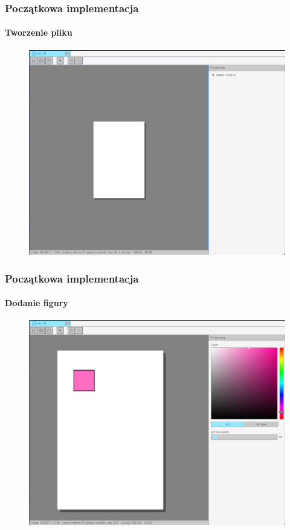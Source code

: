 \documentclass[
	11pt,]{beamer}
\begin{document}
\begin{frame}
	\frametitle{Początkowa implementacja}
	\framesubtitle{Tworzenie pliku}
	
	\begin{figure}
		\includegraphics[height=0.7\textheight]{figures/pro2.png}
	\end{figure}
\end{frame}

\begin{frame}
	\frametitle{Początkowa implementacja}
	\framesubtitle{Dodanie figury}
	
	\begin{figure}
		\includegraphics[height=0.7\textheight]{figures/pro3.png}
	\end{figure}
\end{frame}
\end{document}
